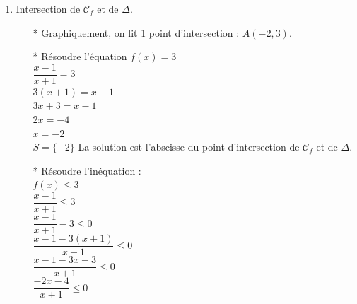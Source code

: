 \begin{enumerate}
\item Intersection de $\mathcal{C}_f$ et de $\Delta$.

\begin{itemize}
\item [*] Graphiquement, on lit 1 point d'intersection : $A(-2, 3)$.

\item [*] Résoudre l'équation $f(x) = 3$\\

$ \dfrac{x - 1}{x + 1} = 3$\\

$3 (x + 1)  = x - 1 $\\
$3 x + 3 = x - 1$ \\
$2x = -4 $\\


$ x = -2 $ \\

$S=\{-2\}$ La solution est l'abscisse 
               du point d'intersection de $\mathcal{C}_f$ et de $\Delta$.\\
               
\item [*] Résoudre l'inéquation : \\

$f(x) \leqslant 3$\\

$ \dfrac{x - 1}{x + 1} \leqslant 3$\\

$\dfrac{x - 1}{x + 1} - 3 \leqslant 0 $ \\

$\dfrac{x - 1 -3(x + 1)}{x + 1}  \leqslant 0 $ \\

$\dfrac{x - 1 -3x -3 }{x + 1}  \leqslant 0 $ \\

$\dfrac{-2x -4 }{x + 1}  \leqslant 0 $ \\



\end{itemize}
\end{enumerate}
